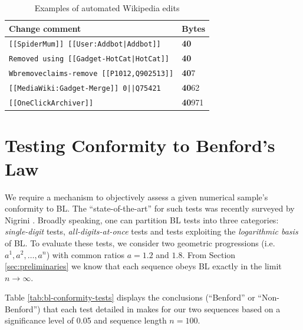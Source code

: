 \documentclass[twoside,leqno,twocolumn]{article}\usepackage[]{graphicx}\usepackage[]{color}
\begin{document}
\begin{table}[h!]
  \centering
  \begin{tabular}{|l|l|}
    \hline    
    \textbf{Change comment} & \textbf{Bytes} \\
    \hline
    \footnotesize{\texttt{[[SpiderMum]] [[User:Addbot|Addbot]]}} & \textbf{40} \\
    \footnotesize{\texttt{Removed using [[Gadget-HotCat|HotCat]]}} & \textbf{40} \\
    \footnotesize{\texttt{Wbremoveclaims-remove [[P1012,Q902513]]}} & \textbf{40}7 \\
    \footnotesize{\texttt{[[MediaWiki:Gadget-Merge]] 0||Q75421}} & \textbf{40}62 \\    
    \footnotesize{\texttt{[[OneClickArchiver]]}} & \textbf{40}971 \\    
    \hline
  \end{tabular}
  \caption{Examples of automated Wikipedia edits}
  \label{tab:wikiBotCommentExamples}
\end{table}


\section{Testing Conformity to Benford's Law}
\label{sec:test-conf-benf}



We require a mechanism to objectively assess a given numerical sample's conformity to BL. The ``state-of-the-art'' for such tests was recently surveyed by Nigrini \cite{nigrini2012}. Broadly speaking, one can partition BL tests into three categories: \textit{single-digit} tests, \textit{all-digits-at-once} tests and tests exploiting the \textit{logarithmic basis} of BL. To evaluate these tests, we consider two geometric progressions (i.e. $a^1,a^2,\ldots,a^n$) with common ratios $a=1.2$ and $1.8$. From Section \ref{sec:preliminaries} we know that each sequence obeys BL exactly in the limit $n \rightarrow \infty$.

Table \ref{tab:bl-conformity-tests} displays the conclusions (``Benford'' or ``Non-Benford'') that each test detailed in \cite{nigrini2012} makes for our two sequences based on a significance level of 0.05 and sequence length $n=100$.
\end{document}
